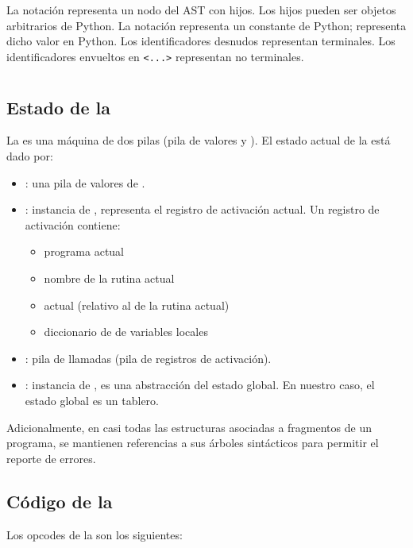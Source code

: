 \documentclass{article}
\begin{document}
La notaci\'on \py{[x1, ..., xN]} representa un nodo del AST
con  hijos. Los hijos pueden ser objetos arbitrarios de
Python. La notaci\'on  representa un 
constante de Python;  representa dicho valor en Python.
Los identificadores desnudos representan
terminales. Los identificadores envueltos en \verb|<...>| representan
no terminales.

\newpage
\section{\GVM}

\subsection{Estado de la \GVM}

La \GVM es una m\'aquina de dos pilas (pila de valores y ).
El estado actual de la \GVM est\'a dado por:

\begin{itemize}
\item {}: una pila de valores de \Gbs.
\item {}: instancia de , representa el registro
      de activaci\'on actual. Un registro de activaci\'on contiene:
      \begin{itemize}
      \item programa actual
      \item nombre de la rutina actual
      \item {} actual (relativo al  de la rutina actual)
      \item diccionario de  de variables locales
      \end{itemize}
\item {}: pila de llamadas (pila de registros de activaci\'on).
\item {}: instancia de , es una
      abstracci\'on del estado global. En nuestro caso, el estado
      global es un tablero.
\end{itemize}

Adicionalmente, en casi todas las estructuras asociadas a fragmentos
de un programa, se mantienen referencias a sus \'arboles sint\'acticos
para permitir el reporte de errores.

\subsection{C\'odigo de la \GVM}
Los opcodes de la \GVM son los siguientes:
\vspace{10pt}
\end{document}
